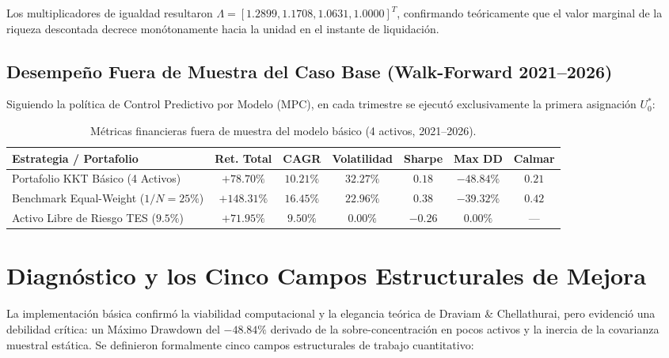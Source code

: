 \documentclass[11pt,a4paper]{article}
\begin{document}
Los multiplicadores de igualdad resultaron $\Lambda = [1.2899, 1.1708, 1.0631, 1.0000]^T$, confirmando teóricamente que el valor marginal de la riqueza descontada decrece monótonamente hacia la unidad en el instante de liquidación.

\subsection{Desempeño Fuera de Muestra del Caso Base (Walk-Forward 2021--2026)}
Siguiendo la política de Control Predictivo por Modelo (MPC), en cada trimestre se ejecutó exclusivamente la primera asignación $U_0^*$:

\begin{table}[htbp]
\centering
\footnotesize
\setlength{\tabcolsep}{4pt}
\begin{tabular}{lcccccc}
\toprule
Estrategia / Portafolio & Ret. Total & CAGR & Volatilidad & Sharpe & Max DD & Calmar \\
\midrule
Portafolio KKT Básico (4 Activos) & $+78.70\%$ & $10.21\%$ & $32.27\%$ & $0.18$ & $-48.84\%$ & $0.21$ \\
Benchmark Equal-Weight ($1/N = 25\%$) & $+148.31\%$ & $16.45\%$ & $22.96\%$ & $0.38$ & $-39.32\%$ & $0.42$ \\
Activo Libre de Riesgo TES ($9.5\%$) & $+71.95\%$ & $9.50\%$ & $0.00\%$ & $-0.26$ & $0.00\%$ & --- \\
\bottomrule
\end{tabular}
\caption{Métricas financieras fuera de muestra del modelo básico (4 activos, 2021--2026).}
\end{table}

\section{Diagnóstico y los Cinco Campos Estructurales de Mejora}

La implementación básica confirmó la viabilidad computacional y la elegancia teórica de Draviam \& Chellathurai, pero evidenció una debilidad crítica: un Máximo Drawdown del $-48.84\%$ derivado de la sobre-concentración en pocos activos y la inercia de la covarianza muestral estática. Se definieron formalmente cinco campos estructurales de trabajo cuantitativo:
\end{document}
